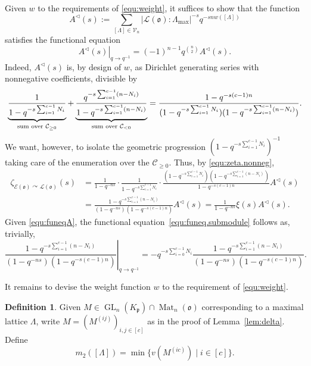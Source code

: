 \documentclass[11pt]{amsart}
\numberwithin{equation}{section}
\numberwithin{figure}{section}
\theoremstyle{plain}
\theoremstyle{definition}
\newtheorem{definition}[theorem]{Definition}
\theoremstyle{remark}
\begin{document}
Given  $w$ to the requirements of \eqref{equ:weight}, it
suffices to show that the function
\begin{equation*}
  A^{\triangleleft}(s) := \sum_{[\Lambda]\in {\ensuremath{\mathcal{V}}}_n}|{\ensuremath{\mathcal{L}}}({\mathfrak o}):\Lambda_{\max}|^{-s}
  q^{-snw([\Lambda])}
\end{equation*}
satisfies the functional equation
\begin{equation}\label{equ:funeqA}
\left.A^{\triangleleft}(s) \right|_{q{\rightarrow} q^{-1}} =
(-1)^{n-1}q^{\binom{n}{2}}A^{\triangleleft}(s).
\end{equation}
Indeed, $A^{\triangleleft}(s)$ is, by design of $w$, as Dirichlet generating
series with nonnegative coefficients, divisible by
$$\underbrace{\frac{1}{1-q^{-s\sum_{i=1}^{c-1}N_i}}}_{\textup{sum over
    ${{\mathcal{C}}}_{\geq0}$}} +
\underbrace{\frac{q^{-s\sum_{i=1}^{c-1}(n-N_i)}}{1-q^{-s\sum_{i=1}^{c-1}(n-N_i)}}}_{\textup{sum
    over ${{\mathcal{C}}}_{<0}$}} =
\frac{1-q^{-s(c-1)n}}{(1-q^{-s\sum_{i=1}^{c-1}N_i})(1-q^{-s\sum_{i=1}^{c-1}(n-N_i)})}.$$
We want, however, to isolate the geometric progression
${(1-q^{-s\sum_{i=1}^{c-1}N_i})^{-1}}$ taking care of the enumeration
over the ${{\mathcal{C}}}_{\geq0}$. Thus, by \eqref{equ:zeta.nonneg},
\begin{align*}
  \zeta_{{\mathcal{E}}({\mathfrak o}){\curvearrowright} {\ensuremath{\mathcal{L}}}({\mathfrak o})}(s) &= \frac{1}{1-q^{-ns}}\cdot
  \frac{1}{1-q^{-s\sum_{i=1}^{c-1}N_i}}\cdot
  \frac{(1-q^{-s\sum_{i=1}^{c-1}N_i})(1-q^{-s\sum_{i=1}^{c-1}(n-N_i)})}{1-q^{-s(c-1)n}}A^{\triangleleft}(s)\\ &=
  \frac{1-q^{-s\sum_{i=1}^{c-1}(n-N_i)}}{(1-q^{-ns})(1-q^{-s(c-1)n})}A^{\triangleleft}(s)
  = \frac{1}{1-q^{-ns}} \xi(s) A^{\triangleleft}(s).
\end{align*}
Given \eqref{equ:funeqA}, the functional
equation~\eqref{equ:funeq.submodule} follows as, trivially,
\begin{equation}\label{equ:funeqtrivial}
  \left. \frac{1-q^{-s\sum_{i=1}^{c-1}(n-N_i)}}{(1-q^{-ns})(1-q^{-s(c-1)n})}
  \right|_{q {\rightarrow} q^{-1}} = -q^{-s\sum_{i=0}^{c-1}N_i}
  \frac{1-q^{-s\sum_{i=1}^{c-1}(n-N_i)}}{(1-q^{-ns})(1-q^{-s(c-1)n})}.
\end{equation}

It remains to devise the weight function $w$ to the requirement of
\eqref{equ:weight}.
\begin{definition}
  Given $M\in\operatorname{GL}_n(K_{\mathfrak{p}})\cap \operatorname{Mat}_n({\mathfrak o})$ corresponding to a
  maximal lattice $\Lambda$, write $M=\left( M^{(ij)}
  \right)_{i,j\in[c]}$ as in the proof of
  Lemma~\ref{lem:delta}. Define
$$m_2([\Lambda]) = \min\{
v(M^{(ic)})\mid i\in [c]\}.$$
\end{definition}
\end{document}
